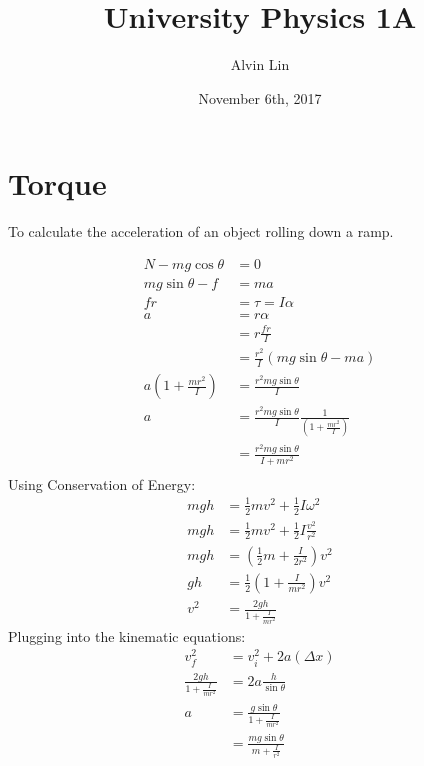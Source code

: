 \documentclass{math}
\title{University Physics 1A}
\author{Alvin Lin}
\date{November 6th, 2017}
\begin{document}
\maketitle

\section*{Torque}
To calculate the acceleration of an object rolling down a ramp.
\begin{center}
\end{center}
\begin{align*}
  N-mg\cos\theta &= 0 \\
  mg\sin\theta-f &= ma \\
  fr &= \tau = I\alpha \\
  a &= r\alpha \\
  &= r\frac{fr}{I} \\
  &= \frac{r^2}{I}(mg\sin\theta-ma) \\
  a(1+\frac{mr^2}{I}) &= \frac{r^2mg\sin\theta}{I} \\
  a &= \frac{r^2mg\sin\theta}{I}\frac{1}{(1+\frac{mr^2}{I})} \\
  &= \frac{r^2mg\sin\theta}{I+mr^2} \\
\end{align*}
Using Conservation of Energy:
\begin{align*}
  mgh &= \frac{1}{2}mv^2+\frac{1}{2}I\omega^2 \\
  mgh &= \frac{1}{2}mv^2+\frac{1}{2}I\frac{v^2}{r^2} \\
  mgh &= \left(\frac{1}{2}m+\frac{I}{2r^2}\right)v^2 \\
  gh &= \frac{1}{2}(1+\frac{I}{mr^2})v^2 \\
  v^2 &= \frac{2gh}{1+\frac{I}{mr^2}}
\end{align*}
Plugging into the kinematic equations:
\begin{align*}
  v_f^2 &= v_i^2+2a(\Delta x) \\
  \frac{2gh}{1+\frac{I}{mr^2}} &= 2a\frac{h}{\sin\theta} \\
  a &= \frac{g\sin\theta}{1+\frac{I}{mr^2}} \\
  &= \frac{mg\sin\theta}{m+\frac{I}{r^2}}
\end{align*}
\end{document}
